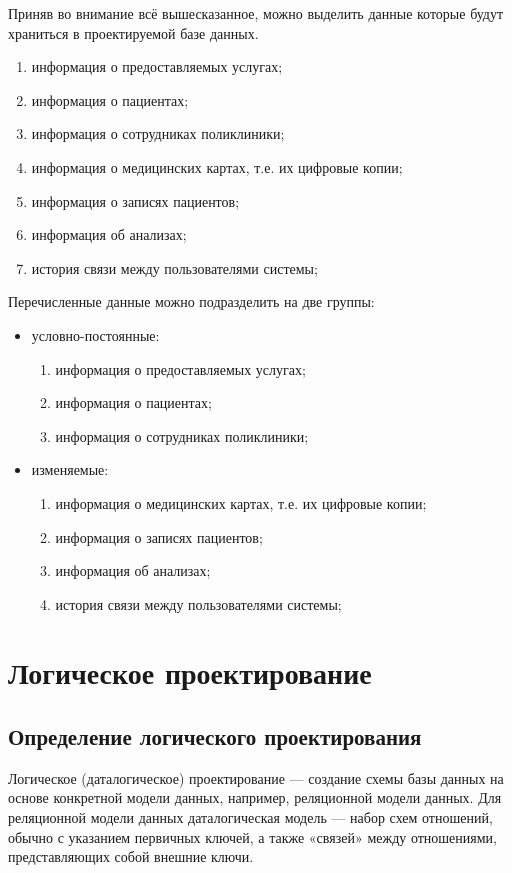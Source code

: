 \documentclass[14pt,a4paper,russian]{extreport}
\begin{document}
\newpage
Приняв во внимание всё вышесказанное, можно выделить данные которые будут храниться в проектируемой
базе данных.
\begin{enumerate}[noitemsep]
    \item информация о предоставляемых услугах;
    \item информация о пациентах;
    \item информация о сотрудниках поликлиники;
    \item информация о медицинских картах, т.е. их цифровые копии;
    \item информация о записях пациентов;
    \item информация об анализах;
    \item история связи между пользователями системы;
\end{enumerate}

\noindent Перечисленные данные можно подразделить на две группы:
\begin{itemize}[noitemsep]
    \item условно-постоянные:
        \begin{enumerate}[noitemsep]
            \item информация о предоставляемых услугах;
            \item информация о пациентах;
            \item информация о сотрудниках поликлиники;
        \end{enumerate}
    \item изменяемые:
        \begin{enumerate}[noitemsep]
            \item информация о медицинских картах, т.е. их цифровые копии;
            \item информация о записях пациентов;
            \item информация об анализах;
            \item история связи между пользователями системы;
        \end{enumerate}
\end{itemize}


\chapter{Логическое проектирование}
\section{Определение логического проектирования}
Логическое (даталогическое) проектирование — создание схемы базы данных на основе конкретной модели
данных, например, реляционной модели данных. Для реляционной модели данных даталогическая модель —
набор схем отношений, обычно с указанием первичных ключей, а также «связей» между
отношениями, представляющих собой внешние ключи.
\end{document}

